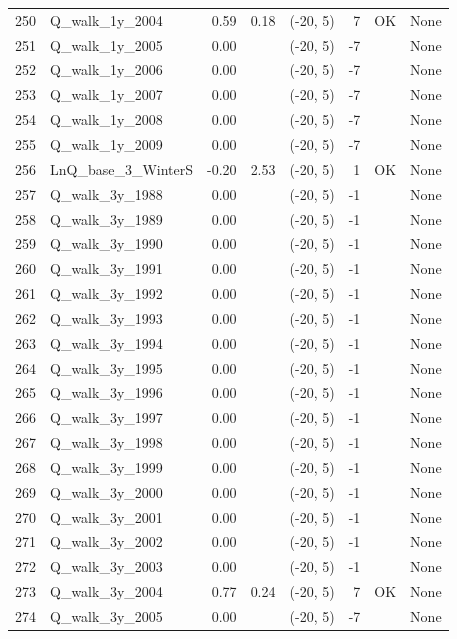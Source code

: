 \documentclass[12pt,]{article}
\begin{document}
\begin{landscape}
\begin{longtable}{rlrrcrcl}
  250 & Q\_walk\_1y\_2004 & 0.59 & 0.18 & (-20, 5) & 7 & OK & None \\ 
  251 & Q\_walk\_1y\_2005 & 0.00 &  & (-20, 5) & -7 &  & None \\ 
  252 & Q\_walk\_1y\_2006 & 0.00 &  & (-20, 5) & -7 &  & None \\ 
  253 & Q\_walk\_1y\_2007 & 0.00 &  & (-20, 5) & -7 &  & None \\ 
  254 & Q\_walk\_1y\_2008 & 0.00 &  & (-20, 5) & -7 &  & None \\ 
  255 & Q\_walk\_1y\_2009 & 0.00 &  & (-20, 5) & -7 &  & None \\ 
  256 & LnQ\_base\_3\_WinterS & -0.20 & 2.53 & (-20, 5) & 1 & OK & None \\ 
  257 & Q\_walk\_3y\_1988 & 0.00 &  & (-20, 5) & -1 &  & None \\ 
  258 & Q\_walk\_3y\_1989 & 0.00 &  & (-20, 5) & -1 &  & None \\ 
  259 & Q\_walk\_3y\_1990 & 0.00 &  & (-20, 5) & -1 &  & None \\ 
  260 & Q\_walk\_3y\_1991 & 0.00 &  & (-20, 5) & -1 &  & None \\ 
  261 & Q\_walk\_3y\_1992 & 0.00 &  & (-20, 5) & -1 &  & None \\ 
  262 & Q\_walk\_3y\_1993 & 0.00 &  & (-20, 5) & -1 &  & None \\ 
  263 & Q\_walk\_3y\_1994 & 0.00 &  & (-20, 5) & -1 &  & None \\ 
  264 & Q\_walk\_3y\_1995 & 0.00 &  & (-20, 5) & -1 &  & None \\ 
  265 & Q\_walk\_3y\_1996 & 0.00 &  & (-20, 5) & -1 &  & None \\ 
  266 & Q\_walk\_3y\_1997 & 0.00 &  & (-20, 5) & -1 &  & None \\ 
  267 & Q\_walk\_3y\_1998 & 0.00 &  & (-20, 5) & -1 &  & None \\ 
  268 & Q\_walk\_3y\_1999 & 0.00 &  & (-20, 5) & -1 &  & None \\ 
  269 & Q\_walk\_3y\_2000 & 0.00 &  & (-20, 5) & -1 &  & None \\ 
  270 & Q\_walk\_3y\_2001 & 0.00 &  & (-20, 5) & -1 &  & None \\ 
  271 & Q\_walk\_3y\_2002 & 0.00 &  & (-20, 5) & -1 &  & None \\ 
  272 & Q\_walk\_3y\_2003 & 0.00 &  & (-20, 5) & -1 &  & None \\ 
  273 & Q\_walk\_3y\_2004 & 0.77 & 0.24 & (-20, 5) & 7 & OK & None \\ 
  274 & Q\_walk\_3y\_2005 & 0.00 &  & (-20, 5) & -7 &  & None \\ 

\end{longtable}
\end{landscape}
\end{document}
